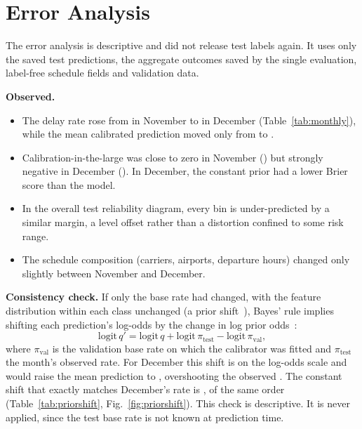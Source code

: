 \documentclass[conference]{IEEEtran}
\begin{document}
\section{Error Analysis}\label{sec:error}


The error analysis is descriptive and did not release test labels again. It uses only the saved
test predictions, the aggregate outcomes saved by the single evaluation, label-free schedule
fields and validation data.

\textbf{Observed.}
\begin{itemize}
\item The delay rate rose from \NovPrev{} in November to \DecPrev{} in December
(Table~\ref{tab:monthly}), while the mean calibrated prediction moved only from \NovMeanPredLR{} to
\DecMeanPredLR{}.
\item Calibration-in-the-large was close to zero in November (\NovCITLLR{}) but strongly negative
in December (\DecCITLLR{}). In December, the constant prior had a lower Brier score than the model.
\item In the overall test reliability diagram, every bin is under-predicted by a similar margin, a
level offset rather than a distortion confined to some risk range.
\item The schedule composition (carriers, airports, departure hours) changed only slightly between
November and December.
\end{itemize}

\textbf{Consistency check.} If only the base rate had changed, with the feature distribution within
each class unchanged (a prior shift~\cite{morenotorres2012}), Bayes' rule implies shifting each
prediction's log-odds by the change in log prior odds~\cite{saerens2002}:
\begin{equation}
\mathrm{logit}\,q' = \mathrm{logit}\,q + \mathrm{logit}\,\pi_{\text{test}} - \mathrm{logit}\,\pi_{\text{val}},
\end{equation}
where $\pi_{\text{val}}$ is the validation base rate on which the calibrator was fitted and
$\pi_{\text{test}}$ the month's observed rate. For December this shift is \DecPriorShift{} on the
log-odds scale and would raise the mean prediction to \DecPriorShiftAdj{}, overshooting the observed
\DecPrev{}. The constant shift that exactly matches December's rate is \DecReqShift{}, of the same
order (Table~\ref{tab:priorshift}, Fig.~\ref{fig:priorshift}). This check is descriptive. It is never
applied, since the test base rate is not known at prediction time.
\end{document}
